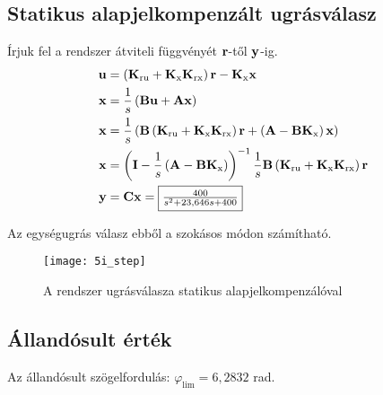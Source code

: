 
\subsection{Statikus alapjelkompenzált ugrásválasz}

Írjuk fel a rendszer átviteli függvényét $\B{r}$-től $\B{y}$-ig.
\begin{align}
	\B{u} &= \brc{\B{K}_\text{ru}+\B{K}_\text{x}\B{K}_\text{rx}}\B{r} - \B{K}_\text{x}\B{x}\\
	\B{x} &= \frac{1}{s}\brc{\B{B}\B{u} + \B{A}\B{x}}\\
	\B{x} &= \frac{1}{s}\brc{\B{B}\brc{\B{K}_\text{ru}+\B{K}_\text{x}\B{K}_\text{rx}}\B{r}+\brc{\B{A}-\B{B}\B{K}_\text{x}}\B{x}}\\
	\B{x} &= \brc{\B{I}-\frac{1}{s}\brc{\B{A}-\B{B}\B{K}_\text{x} }}^{-1}\frac{1}{s}\B{B}\brc{\B{K}_\text{ru}+\B{K}_\text{x}\B{K}_\text{rx}}\B{r}\\
	\B{y} &= \B{C}\B{x} = \fbox{$\frac{400}{s^2 + 23,646 s + 400}$}
\end{align}

Az egységugrás válasz ebből a szokásos módon számítható.
\begin{figure}[H]
	\centering
	\texttt{[image: 5i\_step]}
	\caption{A rendszer ugrásválasza statikus alapjelkompenzálóval}
	\label{fig:5i_step}
\end{figure}


\subsection{Állandósult érték}

Az állandósult szögelfordulás: $\varphi_\text{lim} = 6,2832$ rad.

